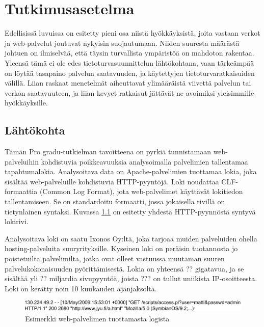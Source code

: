 
\chapter{Tutkimusasetelma}

Edellisissä luvuissa on esitetty pieni osa niistä hyökkäyksistä, joita vastaan verkot ja web-palvelut joutuvat nykyisin suojautumaan. Niiden suuresta määrästä johtuen on ilmiselvää, että täysin 
turvallista ympäristöä on mahdoton rakentaa. Yleensä tämä ei ole edes tietoturvasuunnittelun lähtökohtana, vaan tärkeämpää on löytää tasapaino palvelun saatavuuden, ja käytettyjen tietoturvaratkaisuiden 
välillä. Liian raskaat menetelmät aiheuttavat ylimääräistä viivettä palvelun tai verkon saatavuuteen, ja liian kevyet ratkaisut jättävät ne avoimiksi yleisimmille hyökkäyksille. 

\section{Lähtökohta}

Tämän Pro gradu-tutkielman tavoitteena on pyrkiä tunnistamaan web-palveluihin kohdistuvia poikkeavuuksia analysoimalla palvelimien tallentamaa tapahtumalokia. Analysoitava data on Apache-palvelimien 
tuottamaa lokia, joka sisältää web-palveluille kohdistuvia HTTP-pyyntöjä. Loki noudattaa CLF-formaattia (Common Log Format), jota web-palvelimet käyttävät lokitiedon tallentamiseen. Se on standardoitu 
formaatti, jossa jokaisella rivillä on tietynlainen syntaksi. Kuvassa \ref{CLF} on esitetty yhdestä HTTP-pyynnöstä syntyvä lokirivi. 

Analysoitava loki on saatu Ixonos Oy:ltä, joka tarjoaa muiden palveluiden ohella hosting-palveluita suuryrityksille. Kyseinen loki on peräisin tuotannosta jo poistetuilta palvelimilta, jotka ovat olleet
vastuussa muutaman suuren palvelukokonaisuuden pyörittämisestä. Lokia on yhteensä ?? gigatavua, ja se sisältää yli ?? miljardia sivupyyntöä, joista ??? on tullut uniikista IP-osoitteesta. Loki on kerätty
noin 10 kuukauden ajanjaksolta.

\vspace{3mm}

\begin{figure}[ht]
\centering
\includegraphics[width=15cm]{pics/logi.pdf}
\caption{Esimerkki web-palvelimen tuottamasta logista}
\label{CLF}
\end{figure}

